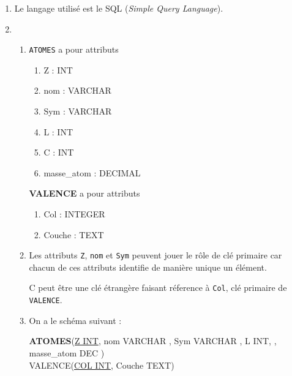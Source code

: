 \documentclass[a4paper,12pt,french]{article}
\begin{document}
\begin{enumerate}[\bfseries 1.]
	\item 	Le langage utilisé est le SQL (\textit{Simple Query Language}).
	\item   \begin{enumerate}[\bfseries a.]
	           \item 	\texttt{ATOMES} a pour attributs
                        \begin{enumerate}[--]
                            \item 	Z : INT
                            \item nom : VARCHAR
                            \item Sym : VARCHAR
                            \item  L : INT
                            \item C : INT
                            \item  masse\_atom : DECIMAL
                        \end{enumerate}
                        \textbf{VALENCE} a pour attributs
                        \begin{enumerate}[--]
                           	\item 	Col : INTEGER
                           	\item 	Couche : TEXT
                        \end{enumerate}
            	\item 	Les attributs \texttt{Z}, \texttt{nom} et \texttt{Sym} peuvent jouer le rôle de clé primaire car chacun de ces attributs identifie de manière
                        unique un élément.

                        C peut être une clé étrangère faisant réference à \texttt{Col}, clé primaire de \texttt{VALENCE}.
                \item 	On a le schéma suivant :

                        \textbf{ATOMES}(\uline{Z INT}, nom VARCHAR , Sym VARCHAR , L INT, , masse\_atom DEC )\\

                        VALENCE(\uline{COL INT}, Couche TEXT)
            \end{enumerate}


\end{enumerate}
\end{document}
